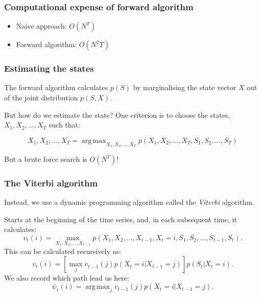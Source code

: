 \documentclass{beamer}
\DeclareMathOperator*{\argmax}{arg\,max}
\begin{document}
\begin{frame}
\frametitle{Computational expense of forward algorithm}

\begin{itemize}
    \item Naive approach: $O(N^T)$
    \item Forward algorithm: $O(N^2 T)$
\end{itemize}
    
\end{frame}

\begin{frame}
\frametitle{Estimating the states}

The forward algorithm calculates $p(S)$ by marginalising the state vector $X$ out of the joint distribution $p(S,X)$.

\vspace{0.5cm}

But how do we estimate the state? One criterion is to choose the states, $X_1,X_2,...,X_T$ such that:

\vspace{0.5cm}

\begin{equation}
    X_1, X_2, ..., X_T = \argmax_{X_1, X_2, ..., X_T}{p(X_1,X_2,...,X_T,S_1, S_2,...,S_T)}
\end{equation}

\vspace{0.5cm}

But a brute force search is $O(N^T)$!

\end{frame}

\begin{frame}
\frametitle{The Viterbi algorithm}

Instead, we use a dynamic programming algorithm called the \textit{Viterbi} algorithm.

\vspace{0.5cm}

Starts at the beginning of the time series, and, in each subsequent time, it calculates:
%
\begin{equation}
    v_t(i) = \max_{X_1, X_2, ..., X_{t-1}} p(X_1, X_2, ..., X_{t-1}, X_t=i, S_1, S_2, ..., S_{t-1}, S_t).
\end{equation}
%
This can be calculated recursively as:
%
\begin{equation}
    v_t(i) = \left[\max_{j} v_{t-1}(j) p(X_t=i|X_{t-1}=j)\right] p(S_t|X_t=i).
\end{equation}
%
We also record which path lead us here:
%
\begin{equation}
    \psi_t(i) = \argmax_{j} v_{t-1}(j) p(X_t=i|X_{t-1}=j).
\end{equation}
    
\end{frame}
\end{document}
